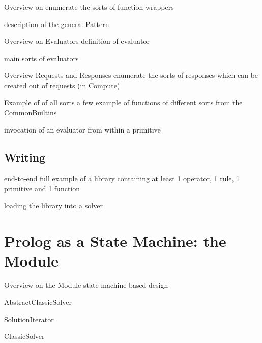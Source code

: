 \documentclass[handout]{beamer}
\begin{document}
\begin{frame}[allowframebreaks]{Overview on }
    enumerate the sorts of function wrappers

    description of the general Pattern
\end{frame}

\begin{frame}[allowframebreaks]{Overview on Evaluators}
    definition of evaluator

    main sorts of evaluators

\end{frame}

\begin{frame}[allowframebreaks]{Overview Requests and Responses}
    enumerate the sorts of responses which can be created out of requests (in Compute)
\end{frame}

\begin{frame}[allowframebreaks]{Example of  of all sorts}
   a few example of functions of different sorts from the CommonBuiltins

   invocation of an evaluator from within a primitive
\end{frame}

\subsection{Writing }

\begin{frame}[allowframebreaks]{ end-to-end}
    full example of a library containing at least 1 operator, 1 rule, 1 primitive and 1 function

    loading the library into a solver
 \end{frame}

\section{Prolog as a State Machine: the  Module}

\begin{frame}[allowframebreaks]{Overview on the  Module}
    state machine based design

    AbstractClassicSolver

    SolutionIterator

    ClassicSolver
\end{frame}
\end{document}
